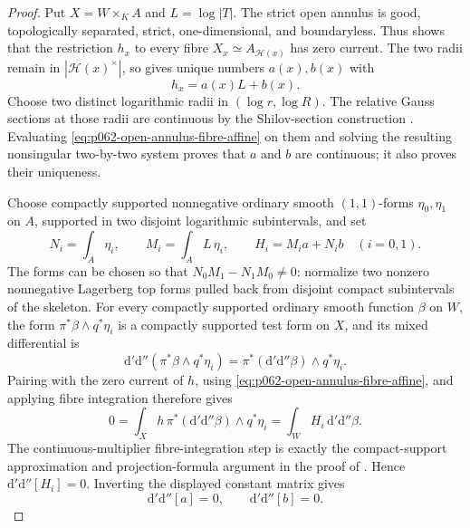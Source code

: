 \begin{proof}
Put \(X=W\times_KA\) and \(L=\log|T|\).  The strict open annulus is
good, topologically separated, strict, one-dimensional, and boundaryless.
Thus  shows that
the restriction \(h_x\) to every fibre
\(X_x\simeq A_{\mathscr H(x)}\) has zero current.  The two radii remain
in \(|\mathscr H(x)^\times|\), so
 gives unique
numbers \(a(x),b(x)\) with
\[
                         h_x=a(x)L+b(x).
\tag{\(*\)}\label{eq:p062-open-annulus-fibre-affine}
\]
Choose two distinct logarithmic radii in \((\log r,\log R)\).  The
relative Gauss sections at those radii are continuous by the
Shilov-section construction \cite[\S\S12.1.10--12.1.11]{CLD25}.
Evaluating \eqref{eq:p062-open-annulus-fibre-affine} on them and solving
the resulting nonsingular two-by-two system proves that \(a\) and \(b\)
are continuous; it also proves their uniqueness.

Choose compactly supported nonnegative ordinary smooth \((1,1)\)-forms
\(\eta_0,\eta_1\) on \(A\), supported in two disjoint logarithmic
subintervals, and set
\[
 N_i=\int_A\eta_i,\qquad M_i=\int_A L\,\eta_i,
 \qquad H_i=M_i a+N_i b \quad (i=0,1).
\]
The forms can be chosen so that \(N_0M_1-N_1M_0\ne0\): normalize two
nonzero nonnegative Lagerberg top forms pulled back from disjoint compact
subintervals of the skeleton.  For every compactly supported ordinary
smooth function \(\beta\) on \(W\), the form
\(\pi^*\beta\wedge q^*\eta_i\) is a compactly supported test form on
\(X\), and its mixed differential is
\[
 \mathrm d'\mathrm d''(\pi^*\beta\wedge q^*\eta_i)
       =\pi^*(\mathrm d'\mathrm d''\beta)\wedge q^*\eta_i.
\]
Pairing with the zero current of \(h\), using \eqref{eq:p062-open-annulus-fibre-affine}, and applying fibre integration therefore gives
\[
 0=\int_Xh\,\pi^*(\mathrm d'\mathrm d''\beta)\wedge q^*\eta_i
   =\int_W H_i\,\mathrm d'\mathrm d''\beta.
\]
The continuous-multiplier fibre-integration step is exactly the
compact-support approximation and projection-formula argument in the proof
of .  Hence
\(\mathrm d'\mathrm d''[H_i]=0\).  Inverting the displayed constant
matrix gives
\[
              \mathrm d'\mathrm d''[a]=0,
              \qquad \mathrm d'\mathrm d''[b]=0.
\tag{\(**\)}\label{eq:p062-open-annulus-coefficients-zero-current}
\]


\end{proof}
